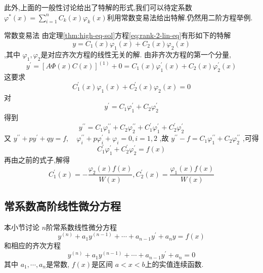 \documentclass[lang=cn,12pt,color=green,fontset=none]{elegantbook}
\begin{document}
此外,上面的一般性讨论给出了特解的形式,我们可以待定系数 $ \varphi ^{*}\left( x \right)= \sum _{i=1}^{n}C_{k}\left( x \right)\varphi _{k}\left( x \right)    $利用常数变易法给出特解.仍然用二阶方程举例.
\begin{proposition}{常数变易法}
    由定理\ref{thm:high-eq-sol}方程\ref{eq:rank-2-lin-eq}有形如下的特解 $$
    y = C_1\left( x \right)\varphi _{1}\left( x \right)+  C_2\left( x \right)\varphi _{2}\left( x \right)    
    $$,其中 $ \varphi _{1},\varphi _{2} $是对应齐次方程的线性无关的解. 
    由非齐次方程的第一个分量, $$
    y^{\prime}  = [ A \Phi \left( x \right)C\left( x \right)  ]^{\left( 1 \right) }+ 0= C_1\left( x \right)\varphi _{1}^{\prime} \left( x \right)+ C_2\left( x \right)\varphi _{2}^{\prime} \left( x \right)     
    $$这要求 $$
    C_1^{\prime} \left( x \right)\varphi _{1}\left( x \right)+  C_2^{\prime} \left( x \right)\varphi _{2}\left( x  \right) =0    
    $$对 $$
    y^{\prime} =C_1\varphi _{1}^{\prime} + C_2 \varphi _{2}^{\prime} 
    $$得到 $$
    y^{\prime \prime } =C_1 \varphi _{1}^{\prime \prime } + C_2\varphi _{2}^{\prime \prime } +  C_1^{\prime} \varphi _{1}^{\prime} + C_2^{\prime} \varphi _{2}^{\prime} 
    $$又 $ y^{\prime \prime } + py^{\prime} + qy=f,\quad \varphi _{i}^{\prime \prime } +  p\varphi _{i}^{\prime} + \varphi _{i}  =0,i=1,2 $ ,故 $ y^{\prime \prime } -f=C_1\varphi _{1}^{\prime \prime } + C_2\varphi _{2}^{\prime \prime }  $  ,可得 $$
    C_1^{\prime} \varphi _{1}^{\prime} + C_2^{\prime} \varphi _{2}^{\prime} =f\left( x \right) 
    $$ 再由之前的式子,解得 $$
    C_1^{\prime} \left( x \right) = - \frac{\varphi _{2}\left( x \right)f\left( x \right)   }{ W\left( x \right) }  ,C_2^{\prime} \left( x \right)= \frac{\varphi _{1}\left( x \right)f\left( x \right)   }{W\left( x \right)  }  
    $$
\end{proposition}

\subsection{常系数高阶线性微分方程}

本小节讨论 $ n $阶常系数线性微分方程
\begin{equation}\label{eq:const-coffi-nonhomo-eq}
    y^{\left( n \right) }+ a_1y^{\left( n-1 \right) }+ \cdots + a_{n-1}y^{\prime} + a_{n}y=f\left( x \right) 
\end{equation} 
和相应的齐次方程 \begin{equation}\label{eq:const-coffi-homo-eq}
    y^{\left( n \right) }+ a_1y^{\left( n-1 \right) }+ \cdots + a_{n-1}y^{\prime} + a_{n}=0
\end{equation}其中 $  a_1,\cdots,a_n  $是常数, $ f\left( x \right)  $是区间 $ a<x<b $上的实值连续函数.   
\end{document}
